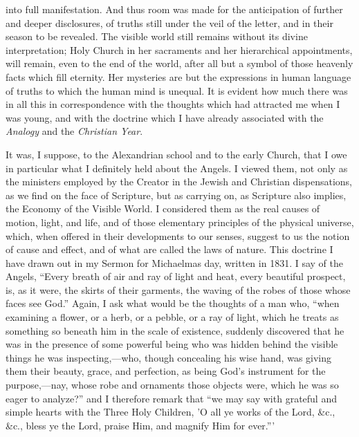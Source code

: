 into full manifestation. And thus room was made for the anticipation
of further and deeper disclosures, of truths still under the veil of
the letter, and in their season to be revealed. The visible world
still remains without its divine interpretation; Holy Church in her
sacraments and her hierarchical appointments, will remain,
even to the end of the world, after all but a symbol of those heavenly facts which fill eternity.
Her mysteries are but the expressions in human language of truths to
which the human mind is unequal. It is evident how much there was in
all this in correspondence with the thoughts which had attracted me
when I was young, and with the doctrine which I have already
associated with the \emph{Analogy} and
the \emph{Christian Year}.

It was, I suppose, to
the Alexandrian school and to the early Church, that I owe in
particular what I definitely held about the Angels. I viewed them, not
only as the ministers employed by the Creator in the Jewish and
Christian dispensations, as we find on the face of Scripture, but as
carrying on, as Scripture also implies, the Economy of the Visible
World. I considered them as the real causes of motion, light, and
life, and of those elementary principles of the physical universe,
which, when offered in their developments to our senses, suggest to us
the notion of cause and effect, and of what are called the laws of
nature. This doctrine I have drawn out in my
Sermon for Michaelmas day, written in 1831. I say of the Angels, ``Every breath of air and ray of
light and heat, every beautiful prospect, is, as it were, the skirts
of their garments, the waving of the robes of those whose faces see
God.'' Again, I ask what would be the thoughts of a man who,
``when examining a flower, or a herb, or a pebble, or a ray of
light, which he treats as something so beneath him in the scale of
existence, suddenly discovered that he was in the presence of some
powerful being who was hidden behind the visible things he was
inspecting,—who, though concealing his wise hand, was
giving them their beauty, grace, and perfection, as being God's
instrument for the purpose,—nay, whose robe and ornaments
those objects were, which he was so eager to analyze?'' and I
therefore remark that ``we may say with grateful and simple hearts
with the Three Holy Children, 'O all ye works of the Lord, \&c.,
\&c., bless ye the Lord, praise Him, and magnify Him for ever.'''

